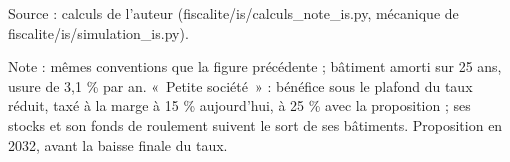 Source : calculs de l'auteur (fiscalite/is/calculs\_note\_is.py, mécanique de fiscalite/is/simulation\_is.py).\par Note : mêmes conventions que la figure précédente ; bâtiment amorti sur 25 ans, usure de 3,1 \% par an. «~Petite société~» : bénéfice sous le plafond du taux réduit, taxé à la marge à 15 \% aujourd'hui, à 25 \% avec la proposition ; ses stocks et son fonds de roulement suivent le sort de ses bâtiments. Proposition en 2032, avant la baisse finale du taux.
